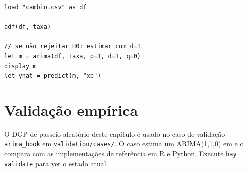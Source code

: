 \begin{lstlisting}[caption={Fluxo típico com dados reais}]
load "cambio.csv" as df

adf(df, taxa)

// se não rejeitar H0: estimar com d=1
let m = arima(df, taxa, p=1, d=1, q=0)
display m
let yhat = predict(m, "xb")
\end{lstlisting}

\section{Validação empírica}

O DGP de passeio aleatório deste capítulo é usado no caso de validação
\texttt{arima_book} em \texttt{validation/cases/}. O caso estima um
ARIMA(1,1,0) em \hayashi{} e o compara com as implementações de referência em
R e Python. Execute \lstinline{hay validate} para ver o estado atual.

